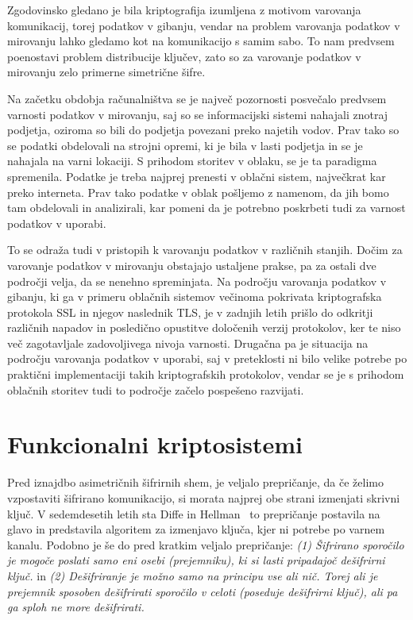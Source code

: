\documentclass[12pt,a4paper,openany,tikz]{book}
\theoremstyle{plain}
\theoremstyle{definition}
\begin{document}
Zgodovinsko gledano je bila kriptografija izumljena z motivom varovanja komunikacij, torej podatkov v gibanju, vendar na problem varovanja podatkov v mirovanju lahko gledamo kot na komunikacijo s samim sabo. To nam predvsem poenostavi problem distribucije ključev, zato so za varovanje podatkov v mirovanju zelo primerne simetrične šifre.

Na začetku obdobja računalništva se je največ pozornosti posvečalo predvsem varnosti podatkov v mirovanju, saj so se informacijski sistemi nahajali znotraj podjetja, oziroma so bili do podjetja povezani preko najetih vodov. Prav tako so se podatki obdelovali na strojni opremi, ki je bila v lasti podjetja in se je nahajala na varni lokaciji. S prihodom storitev v oblaku, se je ta paradigma spremenila. Podatke je treba najprej prenesti v oblačni sistem, največkrat kar preko interneta. Prav tako podatke v oblak pošljemo z namenom, da jih bomo tam obdelovali in analizirali, kar pomeni da je potrebno poskrbeti tudi za varnost podatkov v uporabi.

To se odraža tudi v pristopih k varovanju podatkov v različnih stanjih. Dočim za varovanje podatkov v mirovanju obstajajo ustaljene prakse, pa za ostali dve področji velja, da se nenehno spreminjata. Na področju varovanja podatkov v gibanju, ki ga v primeru oblačnih sistemov večinoma pokrivata kriptografska protokola \acrfull{SSL} in njegov naslednik \acrfull{TLS}, je v zadnjih letih prišlo do odkritji različnih napadov in posledično opustitve določenih verzij protokolov, ker te niso več zagotavljale zadovoljivega nivoja varnosti. Drugačna pa je situacija na področju varovanja podatkov v uporabi, saj v preteklosti ni bilo velike potrebe po praktični implementaciji takih kriptografskih protokolov, vendar se je s prihodom oblačnih storitev tudi to področje začelo pospešeno razvijati.

\section{Funkcionalni kriptosistemi}
\label{sec:Funkcionalni kriptosistemi}

Pred iznajdbo asimetričnih šifrirnih shem, je veljalo prepričanje, da če želimo vzpostaviti šifrirano komunikacijo, si morata najprej obe strani izmenjati skrivni ključ. V sedemdesetih letih sta Diffe in Hellman~\cite{diffie1976new} to prepričanje postavila na glavo in predstavila algoritem za izmenjavo ključa, kjer ni potrebe po varnem kanalu.
Podobno je še do pred kratkim veljalo prepričanje: \textit{(1) Šifrirano sporočilo je mogoče poslati samo eni osebi (prejemniku), ki si lasti pripadajoč dešifrirni ključ.} in  \textit{(2) Dešifriranje je možno samo na principu vse ali nič. Torej ali je prejemnik sposoben dešifrirati sporočilo v celoti (poseduje dešifrirni ključ), ali pa ga sploh ne more dešifrirati.}
\end{document}
